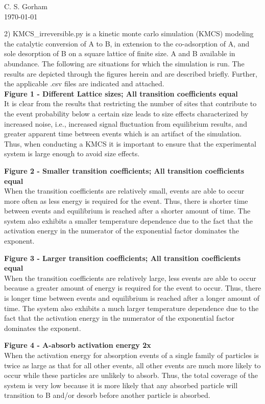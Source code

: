 \documentclass[11pt]{article}
\begin{document}
C. S. Gorham\\
 \today 

2) KMCS\_irreversible.py is a kinetic monte carlo simulation (KMCS) modeling the catalytic conversion of A to B, in extension to the co-adsorption of A, and sole desorption of B on a square lattice of finite size. A and B available in abundance. The following are situations for which the simulation is run. The results are depicted through the figures herein and are described briefly. Further, the applicable .csv files are indicated and attached. \\

{\bf{Figure 1 - Different Lattice sizes; All transition coefficients equal}}\\
\hspace*{1cm}It is clear from the results that restricting the number of sites that contribute to the event probability below a certain size leads to size effects characterized by increased noise, i.e., increased signal fluctuation from equilibrium results, and greater apparent time between events which is an artifact of the simulation. Thus, when conducting a KMCS it is important to ensure that the experimental system is large enough to avoid size effects. 


{\bf{ Figure 2 - Smaller transition coefficients; All transition coefficients equal }} \\
\hspace*{1cm}When the transition coefficients are relatively small, events are able to occur more often as less energy is required for the event. Thus, there is shorter time between events and equilibrium is reached after a shorter amount of time. The system also exhibits a smaller temperature dependence due to the fact that the activation energy in the numerator of the exponential factor dominates the exponent.


{\bf{Figure 3 - Larger transition coefficients; All transition coefficients equal}}\\
\hspace*{1cm}When the transition coefficients are relatively large, less events are able to occur because a greater amount of energy is required for the event to occur. Thus, there is longer time between events and equilibrium is reached after a longer amount of time. The system also exhibits a much larger temperature dependence due to the fact that the activation energy in the numerator of the exponential factor dominates the exponent.


{\bf{Figure 4 - A-absorb activation energy 2x}}\\
When the activation energy for absorption events of a single family of particles is twice as large as that for all other events, all other events are much more likely to occur while these particles are unlikely to absorb. Thus, the total coverage of the system is very low because it is more likely that any absorbed particle will transition to B and/or desorb before another particle is absorbed. 
\end{document}
